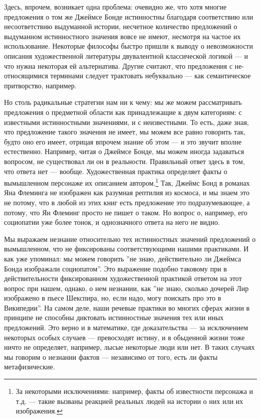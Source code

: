 \documentclass[11pt]{book}
\begin{document}
Здесь, впрочем, возникает одна проблема: очевидно же, что хотя многие предложения о том же Джеймсе Бонде истинностны благодаря соответствию или несоответствию выдуманной истории, несчетное количество предложений о выдуманном истинностного значения вовсе не имеют, несмотря на частое их использование. Некоторые философы быстро пришли к выводу о невозможности описания художественной литературы двувалентной классической логикой --- и что нужна некоторая ей альтернатива. Другие считают, что предложения с не-относящимися терминами следует трактовать небуквально --- как семантическое притворство, например.

Но столь радикальные стратегии нам ни к чему: мы же можем рассматривать предложения о предметной области как принадлежащие к двум категориям: с известными истинностными значениями, и с неизвестными. То есть, даже зная, что предложение такого значения не имеет, мы можем все равно говорить так, будто оно его имеет, отрицая впрочем знание об этом --- и это звучит вполне естественно. Например, читая о Джеймсе Бонде, мы можем иногда задаваться вопросом, не существовал ли он в реальности. Правильный ответ здесь в том, что ответа нет --- вообще. Художественная практика определяет факты о вымышленном персонаже их описанием автором.\footnote{За некоторыми исключениями: например, факты об известности персонажа и т.д. --- такие вызваны реакцией реальных людей на истории о них или их изображения.} Так, Джеймс Бонд в романах Яна Флеминга не изображен как разумная рептилия из космоса, и мы знаем это не потому, что в любой из этих книг есть предложение это подразумевающее, а потому, что Ян Флеминг просто не пишет о таком. Но вопрос о, например, его социопатии уже более тонок, и однозначного ответа на него не видно.

Мы выражаем незнание относительно тех истинностных значений предложений о вымышленном, что не фиксированы соответствующими нашими практиками. И как уже упоминал: мы можем говорить ''не знаю, действительно ли Джеймса Бонда изображали социопатом''. Это выражение подобно таковому при в действительности фиксированном художественной практикой ответом на этот вопрос при нашем, однако, о нем незнании, как ''не знаю, сколько дочерей Лир изображено в пьесе Шекспира, но, если надо, могу поискать про это в Википедии''. На самом деле, наши речевые практики во многих сферах жизни в принципе не способны диктовать истинностные значения тех или иных предложений. Это верно и в математике, где доказательства --- за исключением некоторых особых случаев --- превосходят истину, и в обыденной жизни тоже ничто не определяет, например, лысые некоторые люди или нет. В таких случаях мы говорим о незнании фактов --- независимо от того, есть ли факты метафизические.
\end{document}
